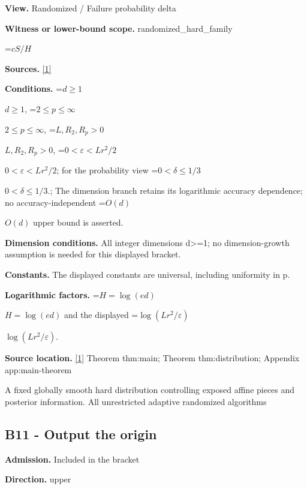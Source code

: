 \documentclass[10pt,a4paper]{article}
\newcommand{\AtlasMath}[1]{\par\begingroup\centering\setbox0=\hbox{$\displaystyle #1$}\ifdim\wd0>1.4\linewidth\typeout{ATLAS WIDE FORMULA: \the\wd0}\fi\ifdim\wd0>\linewidth\resizebox{\linewidth}{!}{\box0}\else\box0\fi\par\endgroup}
\newcommand{\AtlasInlineMath}[1]{\begingroup\setbox0=\hbox{$#1$}\ifdim\wd0>.4\linewidth\endgroup\AtlasMath{#1}\else\endgroup$#1$\fi}
\begin{document}
\textbf{View.} Randomized / Failure probability delta



\textbf{Witness or lower-bound scope.} randomized\_hard\_family



\AtlasMath{cS/H}


\textbf{Sources.} \href{https://github.com/WU-Wendao/Colombo/blob/main/colombo_sensorium/Complexity_altas/data/sources/colombo/U02/manuscript.pdf}{[1]}



\textbf{Conditions.} \AtlasInlineMath{d\ge1}, \AtlasInlineMath{2\le p\le\infty}, \AtlasInlineMath{L,R_2,R_p>0}, \AtlasInlineMath{0<\varepsilon<Lr^2/2}; for the probability view \AtlasInlineMath{0<\delta\le1/3}.; The dimension branch retains its logarithmic accuracy dependence; no accuracy-independent \AtlasInlineMath{O(d)} upper bound is asserted.



\textbf{Dimension conditions.} All integer dimensions d>=1; no dimension-growth assumption is needed for this displayed bracket.



\textbf{Constants.} The displayed constants are universal, including uniformity in p.



\textbf{Logarithmic factors.} \AtlasInlineMath{H=\log(ed)} and the displayed \AtlasInlineMath{\log(Lr^2/\varepsilon)}.



\textbf{Source location.} \href{https://github.com/WU-Wendao/Colombo/blob/main/colombo_sensorium/Complexity_altas/data/sources/colombo/U02/manuscript.pdf}{[1]} Theorem thm:main; Theorem thm:distribution; Appendix app:main-theorem



A fixed globally smooth hard distribution controlling exposed affine pieces and posterior information. All unrestricted adaptive randomized algorithms



\subsection{B11 - Output the origin}


\textbf{Admission.} Included in the bracket



\textbf{Direction.} upper
\end{document}
